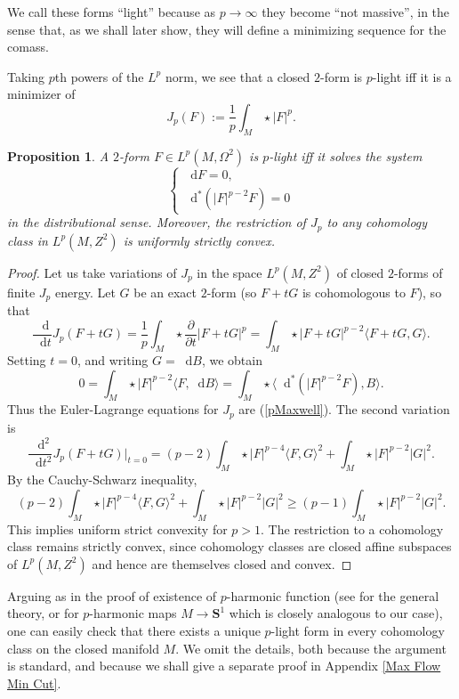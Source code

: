 \documentclass[reqno,11pt]{amsart}
\newcommand{\Sph}{\mathbf S}
\newcommand*\dif{\mathop{}\!\mathrm{d}}
\newtheorem{proposition}[theorem]{Proposition}
\theoremstyle{definition}
\numberwithin{equation}{section}
\begin{document}
We call these forms ``light'' because as $p \to \infty$ they become ``not massive'', in the sense that, as we shall later show, they will define a minimizing sequence for the comass.

Taking $p$th powers of the $L^p$ norm, we see that a closed $2$-form is $p$-light iff it is a minimizer of
$$J_p(F) := \frac{1}{p} \int_M \star |F|^p.$$

\begin{proposition}
A $2$-form $F \in L^p(M, \Omega^2)$ is $p$-light iff it solves the system
\begin{equation}\label{pMaxwell}
\begin{cases}
	\dif F = 0, \\
	\dif^*(|F|^{p - 2} F) = 0
\end{cases}
\end{equation}
in the distributional sense. Moreover, the restriction of $J_p$ to any cohomology class in $L^p(M, Z^2)$ is uniformly strictly convex.
\end{proposition}
\begin{proof}
Let us take variations of $J_p$ in the space $L^p(M, Z^2)$ of closed $2$-forms of finite $J_p$ energy.
Let $G$ be an exact $2$-form (so $F + tG$ is cohomologous to $F$), so that
$$\frac{\dif}{\dif t} J_p(F + tG) = \frac{1}{p} \int_M \star \frac{\partial}{\partial t} |F + tG|^p = \int_M \star |F + tG|^{p - 2} \langle F + tG, G\rangle.$$
Setting $t = 0$, and writing $G = \dif B$, we obtain 
$$0 = \int_M \star |F|^{p - 2} \langle F, \dif B\rangle = \int_M \star \langle \dif^*(|F|^{p - 2} F), B\rangle.$$
Thus the Euler-Lagrange equations for $J_p$ are (\ref{pMaxwell}).
The second variation is 
$$\frac{\dif^2}{\dif t^2} J_p(F + tG)\bigg|_{t = 0} = (p - 2) \int_M \star |F|^{p - 4} \langle F, G\rangle^2 + \int_M \star |F|^{p - 2} |G|^2.$$
By the Cauchy-Schwarz inequality,
$$(p - 2) \int_M \star |F|^{p - 4} \langle F, G\rangle^2 + \int_M \star |F|^{p - 2} |G|^2 \geq (p - 1) \int_M \star |F|^{p - 2} |G|^2.$$
This implies uniform strict convexity for $p > 1$.
The restriction to a cohomology class remains strictly convex, since cohomology classes are closed affine subspaces of $L^p(M, Z^2)$ and hence are themselves closed and convex.
\end{proof}

Arguing as in the proof of existence of $p$-harmonic function (see \cite[\S8.2]{evans2010partial} for the general theory, or \cite[\S2.1]{daskalopoulos2020transverse} for $p$-harmonic maps $M \to \Sph^1$ which is closely analogous to our case), one can easily check that there exists a unique $p$-light form in every cohomology class on the closed manifold $M$.
We omit the details, both because the argument is standard, and because we shall give a separate proof in Appendix \ref{Max Flow Min Cut}.
\end{document}
